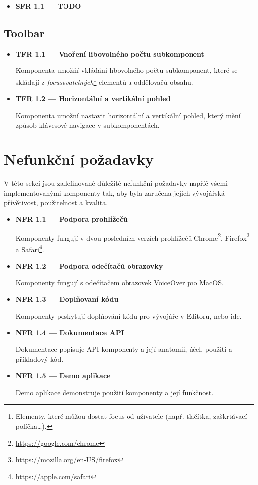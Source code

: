 \begin{itemize}
      \item \textbf{SFR 1.1 --- TODO}
\end{itemize}

\subsection{Toolbar}

\begin{itemize}
      \item \textbf{TFR 1.1 --- Vnoření libovolného počtu subkomponent}\label{tfr11}

            Komponenta umožňí vkládání libovolného počtu subkomponent, které se skládají z \textit{focusovatelných}\footnote{Elementy, které můžou dostat focus od uživatele (např. tlačítka, zaškrtávací políčka\dots).} elementů a oddělovačů obsahu.

      \item \textbf{TFR 1.2 --- Horizontální a vertikální pohled}\label{tfr12}

            Komponenta umožní nastavit horizontální a vertikální pohled, který mění způsob klávesové navigace v subkomponentách.
\end{itemize}

\section{Nefunkční požadavky}

V této sekci jsou zadefinované důležité nefunkční požadavky napříč všemi implementovanými komponenty tak, aby byla zaručena jejich vývojářská přívětivost, použitelnost a kvalita.

\begin{itemize}
      \item \textbf{NFR 1.1 --- Podpora prohlížečů}\label{nfr11}

            Komponenty fungují v dvou posledních verzích prohlížečů Chrome\footnote{\url{https://google.com/chrome}}, Firefox\footnote{\url{https://mozilla.org/en-US/firefox}} a Safari\footnote{\url{https://apple.com/safari}}.

      \item \textbf{NFR 1.2 --- Podpora odečítačů obrazovky}\label{nfr12}

            Komponenty fungují s odečítačem obrazovek VoiceOver pro MacOS.

      \item \textbf{NFR 1.3 --- Doplňovaní kódu}

            Komponenty poskytují doplňování kódu pro vývojáře v Editoru, nebo \gls{ide}.

      \item \textbf{NFR 1.4 --- Dokumentace API}\label{nfr14}

            Dokumentace popisuje API komponenty a její anatomii, účel, použití a příkladový kód.

      \item \textbf{NFR 1.5 --- Demo aplikace}\label{nfr15}

            Demo aplikace demonstruje použití komponenty a její funkčnost.
\end{itemize}

